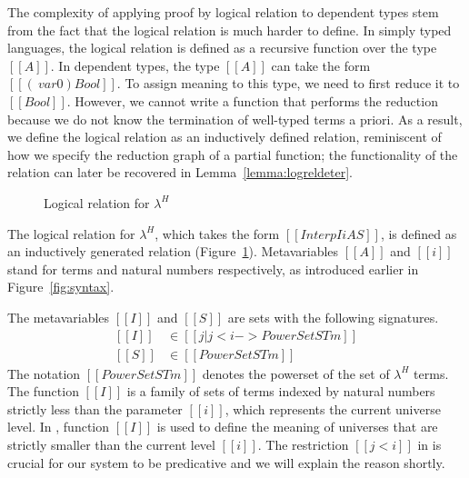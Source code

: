 \documentclass[acmsmall,screen=true,
\ifpublic review=false\else,review=true\fi
  ,anonymous=\ifanonymous true\else false\fi]{acmart}
\newcommand{\lang}{$\lambda^H$\xspace}
\newcommand{\scw}[1]{}
\begin{document}
The complexity of applying proof by logical relation to dependent types stem
from the fact that the logical relation is much harder to define. In
simply typed languages, the logical relation is defined as a recursive
function over the type $[[A]]$. In dependent types, the type
$[[A]]$ can take the form $[[(\ var 0) Bool]]$. To assign meaning to
this type, we need to first reduce it to $[[Bool]]$. However, we
cannot write a function that performs the reduction because we do not
know the termination of well-typed terms a priori. As a result, we
define the logical relation as an inductively defined relation,
reminiscent of how we specify the reduction graph of a partial
function; the functionality of the relation can later be recovered in Lemma~\ref{lemma:logreldeter}.

\label{sec:logreldep}
\begin{figure}[h]
\caption{Logical relation for \lang}
\label{fig:logrel}
\end{figure}
The logical relation for \lang{}, which takes the form $[[Interp I i A
S]]$, is defined as an inductively generated relation (Figure~\ref{fig:logrel}).
Metavariables $[[A]]$ and $[[i]]$ stand for terms and natural
numbers respectively, as introduced earlier in
Figure~\ref{fig:syntax}.
\scw{Many introductory texts define the relation as a recursive function
over type structure, or step-indices. You use an inductive relation instead, why?}
\scw{Can we view this inductive relation as the graph of the partial function
that is defined recursively over types?}
\scw{What is this form extensible too? impredicative quantification? recursive
types? }
\scw{Is it worth observing here that this definition is not over sets of typed
terms. That it characterizes all terms that look like booleans (i.e. evaluate to
true or false) or all terms that look like proofs (i.e. evaluate to refl). The
fact that there is no connection between p and a and b in the I-Eq case is strange
looking. Need to explain.  }
The metavariables $[[I]]$ and $[[S]]$ are
sets with the following signatures.
\begin{equation*}
  \begin{split}
    [[I]] &\in [[ { j | j < i  } ->  PowerSet STm ]] \\
    [[S]] &\in [[PowerSet STm]]
  \end{split}
\end{equation*}
The notation $[[PowerSet STm]]$ denotes the powerset of the set of
\lang{} terms.
The function $[[I]]$ is a family of sets of terms indexed by
natural numbers strictly less than the parameter $[[i]]$, which
represents the current universe level.  In , function
$[[I]]$ is used to define the meaning of
universes that are strictly smaller than the current level $[[i]]$. The
restriction $[[j < i]]$ in  is crucial for our system to
be predicative and we will explain the reason shortly.
\end{document}

